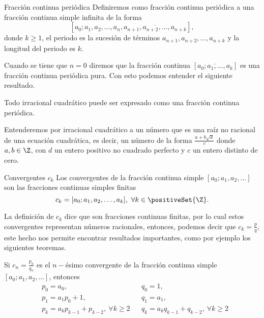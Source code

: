 \begin{definition.box}{Fracción continua periódica}{}
    Definiremos como fracción continua periódica a una fracción continua simple infinita de la forma
    \[
        [a_0; a_1, a_2, \ldots, a_n, \overline{a_{n + 1}, a_{n + 2},\ldots, a_{n + k}}],
    \]
    donde $k \geq 1$, el periodo es la sucesión de términos $a_{n + 1}, a_{n + 2},\ldots, a_{n + k}$ y la longitud del periodo es $k$.
\end{definition.box}

Cuando se tiene que $n = 0$ diremos que la fracción continua $[\overline{a_0;a_1, \ldots, a_k}]$ es una fracción continua periódica pura.
Con esto podemos entender el siguiente resultado.

\begin{theorem.box}{}{}
    Todo irracional cuadrático puede ser expresado como una fracción continua periódica.
\end{theorem.box}

Entenderemos por irracional cuadrático a un número que es una raíz no racional de una ecuación cuadrática, es decir, un número de la forma $\frac{a + b\sqrt {d}}{c}$ donde $a,b \in \Z$, con $d$ un entero positivo no cuadrado perfecto y $c$ un entero distinto de cero.

\begin{definition.box}{Convergentes $c_k$}{}
    Los convergentes de la fracción continua simple $[a_0; a_1, a_2, \ldots]$ son las fracciones continuas simples finitas
    \[
        c_k = [a_0; a_1, a_2, \ldots, a_k],\ \forall k \in \positiveSet{\Z}.
    \]
\end{definition.box}

La definición de $c_k$ dice que son fracciones continuas finitas, por lo cual estos convergentes representan números racionales,
entonces, podemos decir que $c_k = \frac{p}{q}$, este hecho nos permite encontrar resultados importantes, como por ejemplo los siguientes teoremas.

\begin{theorem.box}{}{}
    Si $c_n = \frac{p_n}{q_n}$ es el $n-$ésimo convergente de la fracción continua simple $[a_0; a_1, a_2, \ldots]$, entonces
    \begin{align*}
        &p_0 = a_0, && q_0 = 1,\\
        &p_1 = a_1 p_0 + 1, && q_1 = a_1,\\
        &p_k = a_k p_{k - 1} + p_{k - 2},\ \forall k \geq 2 && q_k = a_k q_{k - 1} + q_{k - 2},\ \forall k \geq 2
    \end{align*}
\end{theorem.box}


